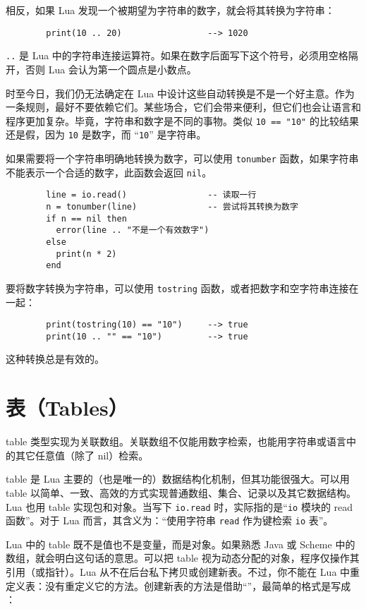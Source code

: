 {{相反，如果 Lua 发现一个被期望为字符串的数字，就会将其转换为字符串：

\begin{verbatim}
        print(10 .. 20)                 --> 1020
\end{verbatim}
\verb|..| 是 Lua 中的字符串连接运算符。如果在数字后面写下这个符号，必须用空格隔开，否则 Lua 会认为第一个圆点是小数点。

时至今日，我们仍无法确定在 Lua 中设计这些自动转换是不是一个好主意。作为一条规则，最好不要依赖它们。某些场合，它们会带来便利，但它们也会让语言和程序更加复杂。毕竟，字符串和数字是不同的事物。类似 \verb|10 == "10"| 的比较结果还是假，因为 \verb|10| 是数字，而 ``\verb|10|'' 是字符串。

如果需要将一个字符串明确地转换为数字，可以使用 \verb|tonumber| 函数，如果字符串不能表示一个合适的数字，此函数会返回 \verb|nil|。

\begin{verbatim}
        line = io.read()                -- 读取一行
        n = tonumber(line)              -- 尝试将其转换为数字
        if n == nil then
          error(line .. "不是一个有效数字")
        else
          print(n * 2)
        end
\end{verbatim}

要将数字转换为字符串，可以使用 \verb|tostring| 函数，或者把数字和空字符串连接在一起：
\begin{verbatim}
        print(tostring(10) == "10")     --> true
        print(10 .. "" == "10")         --> true
\end{verbatim}
这种转换总是有效的。

\section{表（Tables）}

table 类型实现为关联数组。关联数组不仅能用数字检索，也能用字符串或语言中的其它任意值（除了 nil）检索。

table 是 Lua 主要的（也是唯一的）数据结构化机制，但其功能很强大。可以用 table 以简单、一致、高效的方式实现普通数组、集合、记录以及其它数据结构。Lua 也用 table 实现包和对象。当写下 \verb|io.read| 时，实际指的是``\verb|io| 模块的 read 函数''。对于 Lua 而言，其含义为：``使用字符串 \verb|read| 作为键检索 \verb|io| 表''。

Lua 中的 table 既不是值也不是变量，而是对象。如果熟悉 Java 或 Scheme 中的数组，就会明白这句话的意思。可以把 table 视为动态分配的对象，程序仅操作其引用（或指针）。Lua 从不在后台私下拷贝或创建新表。不过，你不能在 Lua 中重定义表：没有重定义它的方法。创建新表的方法是借助``''，最简单的格式是写成 {}：

}}
